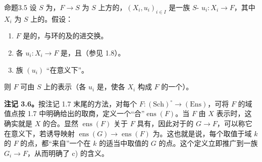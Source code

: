 \begin{SGAresult}{命题}{3.5}
设 $S$ 为，$F\to S$ 为 $S$ 上方的，$(X_i,u_i)_{i\in I}$ 是一族 $S$- $u_i:X_i\to F$，其中 $X_i$ 为 $S$ 上的。假设：
\begin{enumerate}
\item[a)] $F$ 是的，与环的及的进交换。
\item[b)] 各 $u_i:X_i\to F$ 是，且（参见 1.8）。
\item[c)] 族 $(u_i)$ “在意义下”。
\end{enumerate}
则 $F$ 可由 $S$ 上的表示（各 $u_i$ 是，使各 $X_i$ 构成 $F$ 的一个）。
\end{SGAresult}
\textbf{注记 3.6。}按注记 1.7 末尾的方法，对每个 $F:(\mathrm{Sch})^\circ\to(\mathrm{Ens})$，可将 $F$ 的域值点按 1.7 中明确给出的取商，定义一个“合”$\operatorname{ens}(F)$。当 $F$ 由 $X$ 表示时，这确实就是 $X$ 的合。显然 $\operatorname{ens}(F)$ 关于 $F$ 具有，因此对于的 $G\to F$，可以称它在意义下，若诱导映射 $\operatorname{ens}(G)\to\operatorname{ens}(F)$ 为。这也就是说，每个取值于域 $k$ 的 $F$ 的点，都“来自”一个在 $k$ 的适当中取值的 $G$ 的点。这个定义立即推广到一族 $G_i\to F$，从而明确了 c) 的含义。
